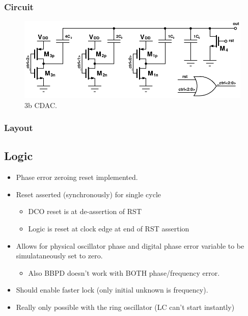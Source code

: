 		\subsubsection{Circuit}
			\begin{figure}[htb!]
			        \centering
			        \includegraphics[width=\textwidth, angle=0]{./figs/design/cdac_3b}
			    \caption{3b CDAC.}
			    \label{fig:3b_cdac_cir}
			\end{figure}
		\subsubsection{Layout}



	\FloatBarrier
	\subsection{Logic}





			\begin{itemize}[itemsep=4pt,label=\protect---]
			        \item Phase error zeroing reset implemented.
			        \item Reset asserted (synchronously) for single cycle 
					\begin{itemize}[itemsep=4pt,label=$\bullet$]
						\item DCO reset is at de-assertion of RST
						\item Logic is reset at clock edge at end of RST assertion
					\end{itemize}
					\item Allows for physical oscillator phase and digital phase error variable to be simulataneously set to zero.
					\begin{itemize}[itemsep=4pt,label=$\bullet$]
						\item Also BBPD doesn't work with BOTH phase/frequency error.
					\end{itemize}
					\item Should enable faster lock (only initial unknown is frequency).
					\item Really only possible with the ring oscillator (LC can't start instantly)
			\end{itemize}

